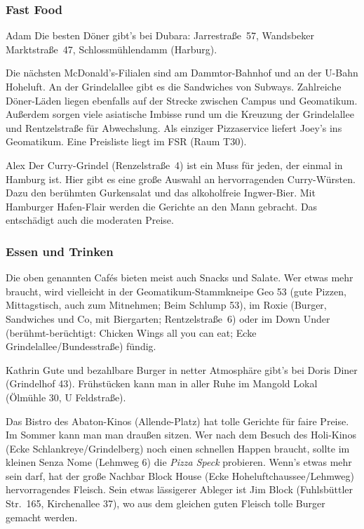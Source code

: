 \subsubsection{Fast Food}

\begin{advice}{Adam}
Die besten Döner gibt's bei Dubara: Jarrestraße~57, Wandsbeker Marktstraße~47,
Schlossmühlendamm (Harburg).
\end{advice}

Die nächsten McDonald's-Filialen sind am Dammtor-Bahnhof und an der U-Bahn
Hoheluft. An der Grindelallee gibt es die Sandwiches von Subways. Zahlreiche
Döner-Läden liegen ebenfalls auf der Strecke zwischen Campus und Geomatikum.
Außerdem sorgen viele asiatische Imbisse rund um die Kreuzung der Grindelallee
und Rentzelstraße für Abwechslung. Als einziger Pizzaservice liefert Joey's ins
Geomatikum. Eine Preisliste liegt im FSR (Raum T30).

\begin{advice}{Alex}
Der Curry-Grindel (Renzelstraße~4) ist ein Muss für jeden, der einmal in
Hamburg ist. Hier gibt es eine große Auswahl an hervorragenden Curry-Würsten.
Dazu den berühmten Gurkensalat und das alkoholfreie Ingwer-Bier. Mit Hamburger
Hafen-Flair werden die Gerichte an den Mann gebracht. Das entschädigt auch die
moderaten Preise.
\end{advice}

\subsubsection{Essen und Trinken}

Die oben genannten Caf\'es bieten meist auch Snacks und Salate. Wer etwas mehr
braucht, wird vielleicht in der Geomatikum-Stammkneipe Geo 53 (gute Pizzen,
Mittagstisch, auch zum Mitnehmen; Beim Schlump 53), im Roxie (Burger,
Sandwiches und Co, mit Biergarten; Rentzelstraße~6) oder im Down Under
(berühmt-berüchtigt: Chicken Wings all you can eat; Ecke
Grindelallee/Bundesstraße) fündig.

\begin{advice}{Kathrin}
Gute und bezahlbare Burger in netter Atmosphäre gibt's bei Doris Diner
(Grindelhof 43). Frühstücken kann man in aller Ruhe im Mangold Lokal (Ölmühle
30, U Feldstraße).
\end{advice}

Das Bistro des Abaton-Kinos (Allende-Platz) hat tolle Gerichte für faire
Preise. Im Sommer kann man man draußen sitzen. Wer nach dem Besuch des Holi-Kinos (Ecke
Schlankreye/Grindelberg) noch einen schnellen Happen braucht, sollte im kleinen
Senza Nome (Lehmweg 6) die \emph{Pizza Speck} probieren. Wenn's etwas mehr sein darf,
hat der große Nachbar Block House (Ecke Hoheluftchaussee/Lehmweg)
hervorragendes Fleisch. Sein etwas lässigerer Ableger ist Jim Block
(Fuhlsbüttler Str.~165, Kirchenallee 37), wo aus dem gleichen guten Fleisch
tolle Burger gemacht werden.

